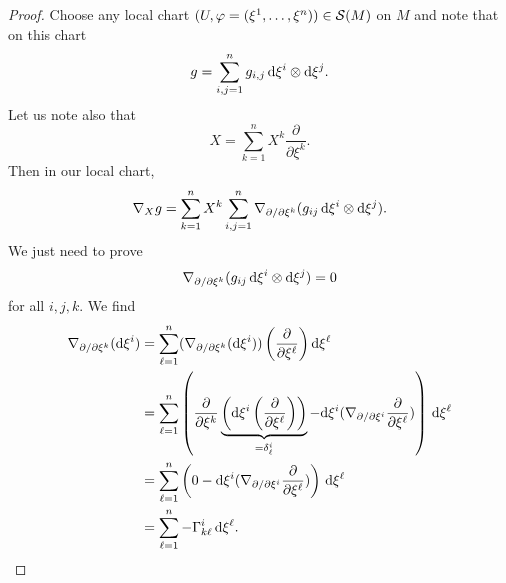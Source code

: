 \begin{proof}
Choose any local chart $(U,\varphi=(\xi^{1},\dots,\xi^{n}))\in\mathcal{S}(M)$
on $M$ and note that on this chart
\begin{equation}
g=\sum^{n}_{i,j=1}g_{i,j}\,\mathrm{d}\xi^{i}\otimes\mathrm{d}\xi^{j}.
\end{equation}
Let us note also that
\begin{equation}
X=\sum^{n}_{k=1}X^{k}\frac{\partial}{\partial\xi^{k}}.
\end{equation}
Then in our local chart,
\begin{equation}
\nabla_{X}g=\sum^{n}_{k=1}X^{k}\sum^{n}_{i,j=1}\nabla_{\partial/\partial\xi^{k}}(g_{ij}\,\mathrm{d}\xi^{i}\otimes\mathrm{d}\xi^{j}).
\end{equation}
We just need to prove
\begin{equation}
\nabla_{\partial/\partial\xi^{k}}(g_{ij}\,\mathrm{d}\xi^{i}\otimes\mathrm{d}\xi^{j})=0
\end{equation}
for all $i,j,k$. We find
\begin{subequations}
  \begin{align}
\nabla_{\partial/\partial\xi^{k}}(\mathrm{d}\xi^{i})
&=\sum^{n}_{\ell=1}(\nabla_{\partial/\partial\xi^{k}}(\mathrm{d}\xi^{i}))\left(\frac{\partial}{\partial\xi^{\ell}}\right)\mathrm{d}\xi^{\ell}\\
&=\sum^{n}_{\ell=1}\left(\frac{\partial}{\partial\xi^{k}}\underbrace{\left(\mathrm{d}\xi^{i}\left(\frac{\partial}{\partial\xi^{\ell}}\right)\right)}_{=\delta^{i}_{\ell}}-\mathrm{d}\xi^{i}(\nabla_{\partial/\partial\xi^{i}}\frac{\partial}{\partial\xi^{\ell}})\right)\,\mathrm{d}\xi^{\ell}\\
&=\sum^{n}_{\ell=1}\left(0-\mathrm{d}\xi^{i}(\nabla_{\partial/\partial\xi^{i}}\frac{\partial}{\partial\xi^{\ell}})\right)\,\mathrm{d}\xi^{\ell}\\
&=\sum^{n}_{\ell=1}-\Gamma^{i}_{k\ell}\,\mathrm{d}\xi^{\ell}.
  \end{align}
\end{subequations}
\end{proof}